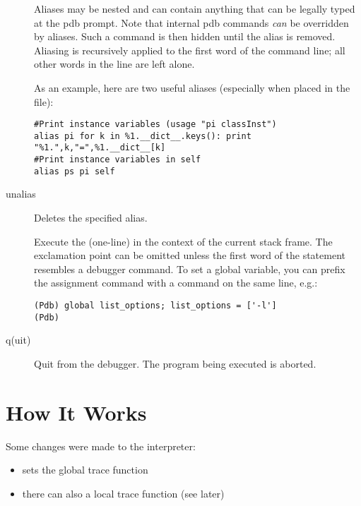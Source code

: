 \begin{description}
Aliases may be nested and can contain anything that can be
legally typed at the pdb prompt.  Note that internal pdb commands
\emph{can} be overridden by aliases.  Such a command is
then hidden until the alias is removed.  Aliasing is recursively
applied to the first word of the command line; all other words
in the line are left alone.

As an example, here are two useful aliases (especially when placed
in the  file):

\begin{verbatim}
#Print instance variables (usage "pi classInst")
alias pi for k in %1.__dict__.keys(): print "%1.",k,"=",%1.__dict__[k]
#Print instance variables in self
alias ps pi self
\end{verbatim}
                
\item[unalias \var{name}]

Deletes the specified alias.

\item[\optional{!}\var{statement}]

Execute the (one-line)  in the context of
the current stack frame.
The exclamation point can be omitted unless the first word
of the statement resembles a debugger command.
To set a global variable, you can prefix the assignment
command with a  command on the same line, e.g.:

\begin{verbatim}
(Pdb) global list_options; list_options = ['-l']
(Pdb)
\end{verbatim}

\item[q(uit)]

Quit from the debugger.
The program being executed is aborted.

\end{description}

\section{How It Works \label{debugger-hooks}}

Some changes were made to the interpreter:

\begin{itemize}
\item {} sets the global trace function
\item there can also a local trace function (see later)
\end{itemize}

